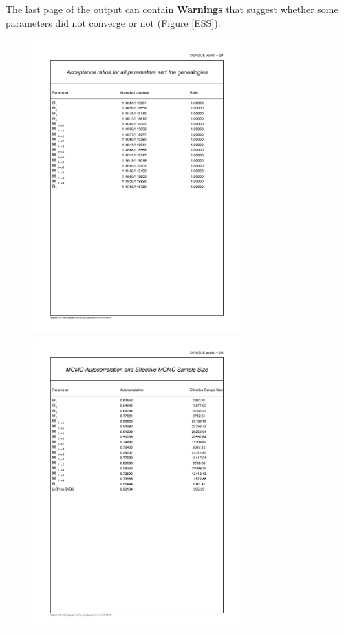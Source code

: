 The last page of the output can contain  \textbf{ Warnings} that suggest whether some parameters did not converge or not (Figure \ref{ESS}). 
\begin{figure}[bh]
\begin{center}
\includegraphics[width=8cm]{mim/acceptance}
\includegraphics[width=8cm]{mim/ess}

\end{center}
\end{figure}
